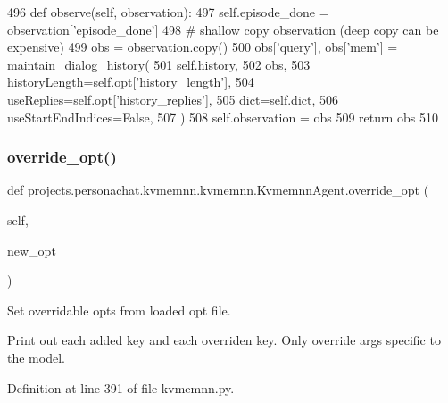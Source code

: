\begin{DoxyCode}
496     \textcolor{keyword}{def }observe(self, observation):
497         self.episode\_done = observation[\textcolor{stringliteral}{'episode\_done'}]
498         \textcolor{comment}{# shallow copy observation (deep copy can be expensive)}
499         obs = observation.copy()
500         obs[\textcolor{stringliteral}{'query'}], obs[\textcolor{stringliteral}{'mem'}] = \hyperlink{namespaceprojects_1_1personachat_1_1kvmemnn_1_1kvmemnn_afe498b578d5df47bf521e2b38dd61605}{maintain\_dialog\_history}(
501             self.history,
502             obs,
503             historyLength=self.opt[\textcolor{stringliteral}{'history\_length'}],
504             useReplies=self.opt[\textcolor{stringliteral}{'history\_replies'}],
505             dict=self.dict,
506             useStartEndIndices=\textcolor{keyword}{False},
507         )
508         self.observation = obs
509         \textcolor{keywordflow}{return} obs
510 
\end{DoxyCode}
\mbox{\label{classprojects_1_1personachat_1_1kvmemnn_1_1kvmemnn_1_1KvmemnnAgent_aa0f3a677ef0e7d3d0f573b98bc0eed9d}} 
\subsubsection{\texorpdfstring{override\+\_\+opt()}{override\_opt()}}
{\footnotesize\ttfamily def projects.\+personachat.\+kvmemnn.\+kvmemnn.\+Kvmemnn\+Agent.\+override\+\_\+opt (\begin{DoxyParamCaption}\item[{}]{self,  }\item[{}]{new\+\_\+opt }\end{DoxyParamCaption})}

\begin{DoxyVerb}Set overridable opts from loaded opt file.

Print out each added key and each overriden key. Only override args specific to
the model.
\end{DoxyVerb}
 

Definition at line 391 of file kvmemnn.\+py.



